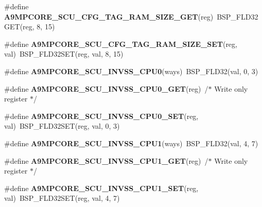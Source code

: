 \begin{DoxyCompactItemize}
\#define {\bfseries A9\+M\+P\+C\+O\+R\+E\+\_\+\+S\+C\+U\+\_\+\+C\+F\+G\+\_\+\+T\+A\+G\+\_\+\+R\+A\+M\+\_\+\+S\+I\+Z\+E\+\_\+\+G\+ET}(reg)~B\+S\+P\+\_\+\+F\+L\+D32\+G\+ET(reg, 8, 15)
\item 
\mbox{\label{arm-a9mpcore-regs_8h_a8a73382ae34db2629d0b3bd511f1e089}} 
\#define {\bfseries A9\+M\+P\+C\+O\+R\+E\+\_\+\+S\+C\+U\+\_\+\+C\+F\+G\+\_\+\+T\+A\+G\+\_\+\+R\+A\+M\+\_\+\+S\+I\+Z\+E\+\_\+\+S\+ET}(reg,  val)~B\+S\+P\+\_\+\+F\+L\+D32\+S\+ET(reg, val, 8, 15)
\item 
\mbox{\label{arm-a9mpcore-regs_8h_ac88183f52d4d6145ba9cb8ff49c55700}} 
\#define {\bfseries A9\+M\+P\+C\+O\+R\+E\+\_\+\+S\+C\+U\+\_\+\+I\+N\+V\+S\+S\+\_\+\+C\+P\+U0}(ways)~B\+S\+P\+\_\+\+F\+L\+D32(val, 0, 3)
\item 
\mbox{\label{arm-a9mpcore-regs_8h_a6815de98ea1968302c4ed939797cd68b}} 
\#define {\bfseries A9\+M\+P\+C\+O\+R\+E\+\_\+\+S\+C\+U\+\_\+\+I\+N\+V\+S\+S\+\_\+\+C\+P\+U0\+\_\+\+G\+ET}(reg)~/$\ast$ Write only register $\ast$/
\item 
\mbox{\label{arm-a9mpcore-regs_8h_aa73c9888e134074c517f7c5dedc33a48}} 
\#define {\bfseries A9\+M\+P\+C\+O\+R\+E\+\_\+\+S\+C\+U\+\_\+\+I\+N\+V\+S\+S\+\_\+\+C\+P\+U0\+\_\+\+S\+ET}(reg,  val)~B\+S\+P\+\_\+\+F\+L\+D32\+S\+ET(reg, val, 0, 3)
\item 
\mbox{\label{arm-a9mpcore-regs_8h_a592f4e02c8f5747a64c0382dc85d35e0}} 
\#define {\bfseries A9\+M\+P\+C\+O\+R\+E\+\_\+\+S\+C\+U\+\_\+\+I\+N\+V\+S\+S\+\_\+\+C\+P\+U1}(ways)~B\+S\+P\+\_\+\+F\+L\+D32(val, 4, 7)
\item 
\mbox{\label{arm-a9mpcore-regs_8h_a1bdb4cf209ec0237f143768a2b838ac7}} 
\#define {\bfseries A9\+M\+P\+C\+O\+R\+E\+\_\+\+S\+C\+U\+\_\+\+I\+N\+V\+S\+S\+\_\+\+C\+P\+U1\+\_\+\+G\+ET}(reg)~/$\ast$ Write only register $\ast$/
\item 
\mbox{\label{arm-a9mpcore-regs_8h_a7e0610c0f9600b35392b626b79a897fd}} 
\#define {\bfseries A9\+M\+P\+C\+O\+R\+E\+\_\+\+S\+C\+U\+\_\+\+I\+N\+V\+S\+S\+\_\+\+C\+P\+U1\+\_\+\+S\+ET}(reg,  val)~B\+S\+P\+\_\+\+F\+L\+D32\+S\+ET(reg, val, 4, 7)
\item 

\end{DoxyCompactItemize}

